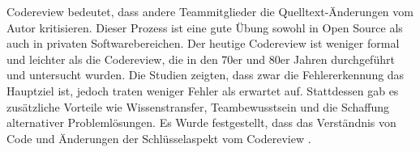 
Codereview bedeutet, dass andere Teammitglieder die Quelltext-Änderungen vom Autor kritisieren. Dieser Prozess ist eine gute Übung sowohl in Open Source als auch in privaten Softwarebereichen. Der heutige Codereview ist weniger formal und leichter als die Codereview, die in den 70er und 80er Jahren durchgeführt und untersucht wurden. Die Studien zeigten, dass zwar die Fehlererkennung das Hauptziel ist, jedoch traten weniger Fehler als erwartet auf. Stattdessen gab es zusätzliche Vorteile wie Wissenstransfer, Teambewusstsein und die Schaffung alternativer Problemlösungen. Es Wurde festgestellt, dass das Verständnis von Code und Änderungen der Schlüsselaspekt vom Codereview \cite{bacchelli2013expectations}.